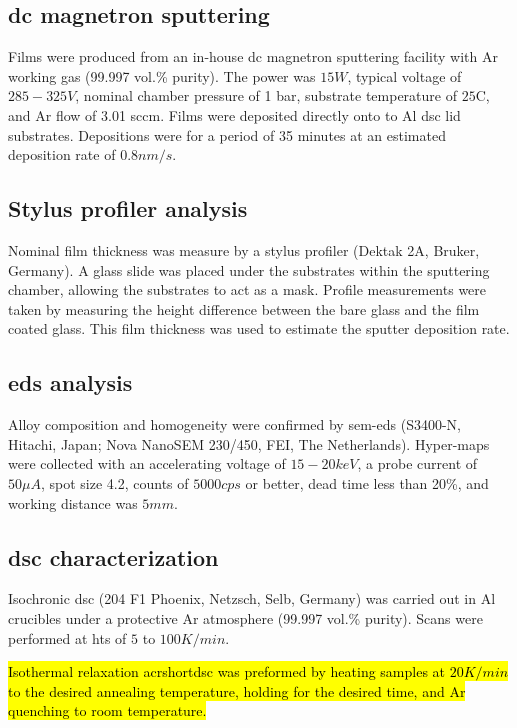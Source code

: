 \documentclass[draft,a4paper,12pt,oneside]{article}%
\begin{document}
\subsection{\acrshort{dc} magnetron sputtering}
Films were produced from an in-house \gls{dc} magnetron sputtering facility with Ar working gas (99.997 vol.\% purity). The power was $15W$, typical voltage of $285-325V$, nominal chamber pressure of 1 bar, substrate temperature of $25$\degree C, and Ar flow of 3.01 \acrshort{sccm}. Films were deposited directly onto to Al \acrshort{dsc} lid substrates. Depositions were for a period of 35 minutes at an estimated deposition rate of $0.8 nm/s$. 

\subsection{Stylus profiler analysis}
Nominal film thickness was measure by a stylus profiler (Dektak 2A, Bruker, Germany). A glass slide was placed under the substrates within the sputtering chamber, allowing the substrates to act as a mask. Profile measurements were taken by measuring the height difference between the bare glass and the film coated glass. This film thickness was used to estimate the sputter deposition rate.  

\subsection{\acrshort{eds} analysis}
Alloy composition and homogeneity were confirmed by \acrshort{sem}-\acrshort{eds} (S3400-N, Hitachi, Japan; Nova NanoSEM 230/450, FEI, The Netherlands). Hyper-maps were collected with an accelerating voltage of $15-20keV$, a probe current of $50 \mu A$, spot size 4.2, counts of $5000cps$ or better, dead time less than 20\%, and working distance was $5mm$.

\subsection{\acrshort{dsc} characterization}
Isochronic \acrshort{dsc} (204 F1 Phoenix, Netzsch, Selb, Germany) was carried out in Al crucibles under a protective Ar atmosphere (99.997 vol.\% purity). Scans were performed at \glspl{ht} of $5$ to $100 K/min$. 

\hl{Isothermal relaxation acrshort{dsc} was preformed by heating samples at $20 K/min$ to the desired annealing temperature, holding for the desired time, and Ar quenching to room temperature.}
\end{document}
